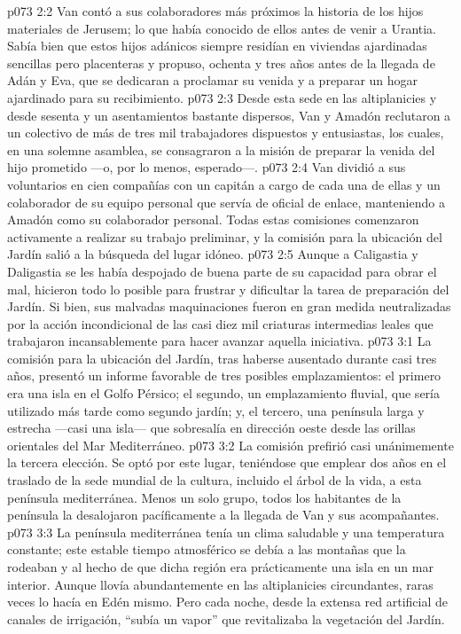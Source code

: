 \vs p073 2:2 Van contó a sus colaboradores más próximos la historia de los hijos materiales de Jerusem; lo que había conocido de ellos antes de venir a Urantia. Sabía bien que estos hijos adánicos siempre residían en viviendas ajardinadas sencillas pero placenteras y propuso, ochenta y tres años antes de la llegada de Adán y Eva, que se dedicaran a proclamar su venida y a preparar un hogar ajardinado para su recibimiento.
\vs p073 2:3 Desde esta sede en las altiplanicies y desde sesenta y un asentamientos bastante dispersos, Van y Amadón reclutaron a un colectivo de más de tres mil trabajadores dispuestos y entusiastas, los cuales, en una solemne asamblea, se consagraron a la misión de preparar la venida del hijo prometido ---o, por lo menos, esperado---.
\vs p073 2:4 Van dividió a sus voluntarios en cien compañías con un capitán a cargo de cada una de ellas y un colaborador de su equipo personal que servía de oficial de enlace, manteniendo a Amadón como su colaborador personal. Todas estas comisiones comenzaron activamente a realizar su trabajo preliminar, y la comisión para la ubicación del Jardín salió a la búsqueda del lugar idóneo.
\vs p073 2:5 \pc Aunque a Caligastia y Daligastia se les había despojado de buena parte de su capacidad para obrar el mal, hicieron todo lo posible para frustrar y dificultar la tarea de preparación del Jardín. Si bien, sus malvadas maquinaciones fueron en gran medida neutralizadas por la acción incondicional de las casi diez mil criaturas intermedias leales que trabajaron incansablemente para hacer avanzar aquella iniciativa.
\vs p073 3:1 La comisión para la ubicación del Jardín, tras haberse ausentado durante casi tres años, presentó un informe favorable de tres posibles emplazamientos: el primero era una isla en el Golfo Pérsico; el segundo, un emplazamiento fluvial, que sería utilizado más tarde como segundo jardín; y, el tercero, una península larga y estrecha ---casi una isla--- que sobresalía en dirección oeste desde las orillas orientales del Mar Mediterráneo.
\vs p073 3:2 La comisión prefirió casi unánimemente la tercera elección. Se optó por este lugar, teniéndose que emplear dos años en el traslado de la sede mundial de la cultura, incluido el árbol de la vida, a esta península mediterránea. Menos un solo grupo, todos los habitantes de la península la desalojaron pacíficamente a la llegada de Van y sus acompañantes.
\vs p073 3:3 \pc La península mediterránea tenía un clima saludable y una temperatura constante; este estable tiempo atmosférico se debía a las montañas que la rodeaban y al hecho de que dicha región era prácticamente una isla en un mar interior. Aunque llovía abundantemente en las altiplanicies circundantes, raras veces lo hacía en Edén mismo. Pero cada noche, desde la extensa red artificial de canales de irrigación, “subía un vapor” que revitalizaba la vegetación del Jardín.
